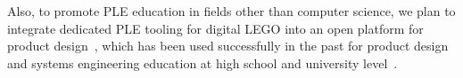 \documentclass[sigconf,review]{acmart}
\begin{document}
Also, to promote PLE education in fields other than computer science, we plan to integrate dedicated PLE tooling for digital LEGO into an open platform for product design~\cite{Hackenberg_2023}, which has been used successfully in the past for product design and systems engineering education at high school and university level~\cite{Hackenberg_2025}.



\end{document}
